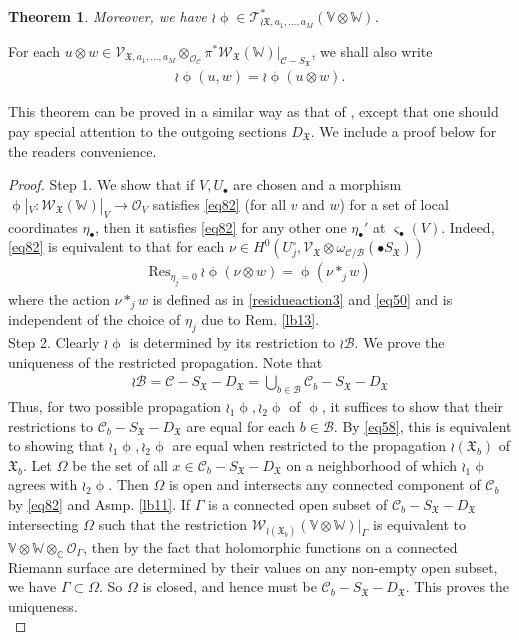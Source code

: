 \documentclass[11pt,b5paper,notitlepage]{article}
\theoremstyle{definition}
\theoremstyle{plain}
\newtheorem{thm}[df]{Theorem}
\newcommand{\fk}{\mathfrak}
\newcommand{\mc}{\mathcal}
\newcommand{\Res}{\mathrm{Res}}
\newcommand{\scr}{\mathscr}
\newcommand{\sgm}{\varsigma}
\newcommand{\SX}{{S_{\fk X}}}
\newcommand{\DX}{D_{\fk X}}
\newcommand{\blt}{\bullet}
\newcommand{\Vbb}{\mathbb V}
\newcommand{\Wbb}{\mathbb W}
\newcommand{\Cbb}{\mathbb C}
\newcommand{\<}{\left\langle}
\renewcommand{\>}{\right\rangle}
\numberwithin{equation}{subsection}
\begin{document}
\begin{thm}
Moreover, we have $\wr\upphi\in\scr T_{\wr{\fk X},a_1,\dots,a_M}^*(\Vbb\otimes\Wbb)$.
\end{thm}

For each $u\otimes w\in \scr V_{\fk X,a_1,\dots,a_M}\otimes_{\mc O_{\mc C}}\pi^*\scr W_{\fk X}(\Wbb)\big|_{\mc C-\SX}$, we shall also write
\begin{align}
\wr\upphi(u,w)=\wr\upphi(u\otimes w).  \label{eq64}
\end{align}

This theorem can be proved in a similar way as that of \cite[Thm. 7.1]{Gui-propagation}, except that one should pay special attention to the outgoing sections $\DX$.  We include a proof below for the readers convenience.  %

\begin{proof}
Step 1. We show that if $V,U_\blt$ are chosen and a morphism $\upphi|_V:\scr W_{\fk X}(\Wbb)|_V\rightarrow \mc O_V$ satisfies \eqref{eq82} (for all $v$ and $w$) for a set of local coordinates $\eta_\blt$, then it satisfies \eqref{eq82} for any other one $\eta_\blt'$ at $\sgm_\blt(V)$. Indeed,  \eqref{eq82} is equivalent to that for each $\nu\in H^0(U_j^\circ,\scr  V_{\fk X}\otimes\omega_{\mc C/\mc B}(\blt\SX))$
\begin{align}
\Res_{\eta_j=0}~\wr\upphi(\nu\otimes w)=\upphi(\nu*_j w)
\end{align}
where the action $\nu*_j w$ is defined as in \eqref{residueaction3} and \eqref{eq50} and is independent of the choice of $\eta_j$ due to Rem. \ref{lb13}.\\

Step 2.  Clearly $\wr\upphi$ is determined by its restriction to $\wr\mc B$. We prove the uniqueness of the restricted propagation.  Note that
\begin{align}
\wr\mc B=\mc C-\SX-\DX=\bigcup_{b\in\mc B}\mc C_b-\SX-\DX\label{eq59}
\end{align}
Thus, for two possible propagation $\wr_1\upphi,\wr_2\upphi$ of $\upphi$,  it suffices to show that their restrictions to $\mc C_b-\SX-\DX$ are equal for each $b\in\mc B$. By \eqref{eq58}, this is equivalent to showing that $\wr_1\upphi,\wr_2\upphi$ are equal when restricted to the propagation $\wr(\fk X_b)$ of $\fk X_b$. Let $\Omega$ be the set of all $x\in\mc C_b-\SX-\DX$ on a neighborhood of which $\wr_1\upphi$ agrees with $\wr_2\upphi$. Then $\Omega$ is open and intersects any connected component of $\mc C_b$ by \eqref{eq82} and Asmp. \ref{lb11}. If $\Gamma$ is a connected open subset of $\mc C_b-\SX-\DX$ intersecting $\Omega$ such that the restriction $\scr W_{\wr(\fk X_b)}(\Vbb\otimes\Wbb)|_\Gamma$ is equivalent to $\Vbb\otimes\Wbb\otimes_\Cbb\mc O_\Gamma$, then by the fact that holomorphic functions on a connected Riemann surface are determined by their values on any non-empty open subset, we have $\Gamma\subset\Omega$. So $\Omega$ is closed, and hence must be $\mc C_b-\SX-\DX$. This proves the uniqueness.\\


\end{proof}
\end{document}
